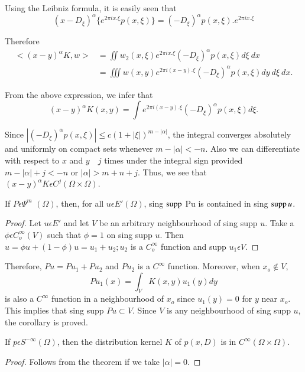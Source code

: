 Using the Leibniz formula, it is easily seen that
$$
(x-D_\xi)^\alpha \{e^{2 \pi ix.\xi}p(x,\xi)\}= (-D_\xi)^\alpha
p(x,\xi).e^{2\pi ix.\xi} 
$$

Therefore
\begin{align*}
  <(x-y)^\alpha K,w > &= \iint w^{\hat{}}_2(x,\xi)e^{2 \pi
    ix.\xi}(-D_\xi)^\alpha p(x,\xi)d\xi~dx\\ 
  &= \iiint w(x,y)e^{2 \pi i(x-y).\xi}(-D_\xi)^\alpha p(x, \xi)dy~d\xi~dx.
\end{align*}

From the above expression, we infer that
$$
(x-y)^\alpha K(x,y)=\int e^{2 \pi i(x-y).\xi}(-D_\xi)^\alpha p(x,\xi)d \xi.
$$

Since $|(-D_\xi)^\alpha p(x,\xi)|\le c(1+|\xi|)^{m-|\alpha|}$, the
integral converges absolutely and uniformly on compact sets whenever
$m-|\alpha | < -n$.  Also we can differentiate with respect to $x$ and
$y \quad j$ times under the integral sign provided $m-|\alpha|+j<-n$
or $|\alpha|> m+n+j$. Thus, we see that $(x-y)^\alpha K \epsilon
C^j(\Omega \times \Omega)$. 

\setcounter{coro}{10}
\begin{coro}\label{chap4:sec2:coro4.11} 
  If $P \epsilon \Psi^m$ $(\Omega)$, then, for all $u \epsilon E'(\Omega)$, sing
  $\operatorname{supp}$ Pu is contained in sing $\operatorname{supp} u$. 
\end{coro}

\begin{proof}
  Let $u \epsilon E'$ and let $V$ be an arbitrary neighbourhood of
  sing supp $u$. Take a $\phi \epsilon C^\infty _o(V)$ such that
  $\phi=1$ on sing supp $u$. Then $u=\phi u +(1- \phi) u = u_1 + u_2 ;
  u_2$ is a $C^\infty_o$ function and supp $u_1 \epsilon V$.  
\end{proof}

Therefore, $Pu = Pu_1  + Pu_2$ and $Pu_2$ is a $C^\infty$
function. Moreover, when $x_o \notin V$,\pageoriginale 
$$
Pu_1(x) = \int_V K(x,y) u_1 (y) dy
$$
is also a $C^\infty$ function in a neighbourhood of $x_o$ since
$u_1(y) = 0$ for $y$ near $x_o$. This implies that sing supp $Pu
\subset V$. Since $V$ is any neighbourhood of sing supp $u$, the
corollary is proved. 

\setcounter{coro}{11}
\begin{coro}\label{chap4:sec2:coro4.12}
  If $p \epsilon S^{- \infty}(\Omega)$, then the distribution
  kernel $K$ of $p(x,D)$ is in $C^\infty (\Omega \times \Omega)$. 
\end{coro}
\begin{proof}
  Follows from the theorem if we take $|\alpha|=0$.
\end{proof}



